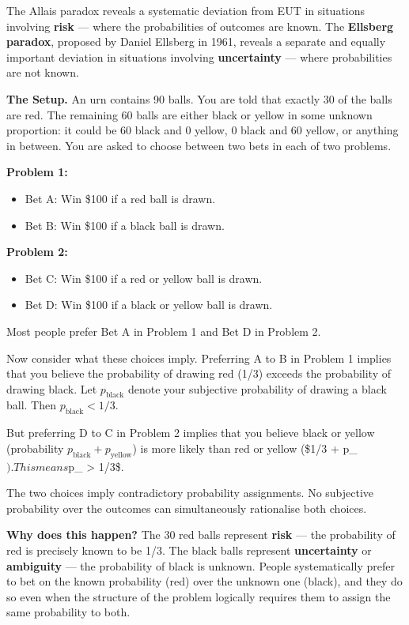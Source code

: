 \documentclass[12pt, letterpaper]{article}
\begin{document}
The Allais paradox reveals a systematic deviation from EUT in situations involving \textbf{risk} --- where the probabilities of outcomes are known. The \textbf{Ellsberg paradox}, proposed by Daniel Ellsberg in 1961, reveals a separate and equally important deviation in situations involving \textbf{uncertainty} --- where probabilities are not known.

\textbf{The Setup.} An urn contains 90 balls. You are told that exactly 30 of the balls are red. The remaining 60 balls are either black or yellow in some unknown proportion: it could be 60 black and 0 yellow, 0 black and 60 yellow, or anything in between. You are asked to choose between two bets in each of two problems.

\textbf{Problem 1:}
\begin{itemize}
\item Bet A: Win \$100 if a red ball is drawn.
\item Bet B: Win \$100 if a black ball is drawn.
\end{itemize}

\textbf{Problem 2:}
\begin{itemize}
\item Bet C: Win \$100 if a red or yellow ball is drawn.
\item Bet D: Win \$100 if a black or yellow ball is drawn.
\end{itemize}

Most people prefer Bet A in Problem 1 and Bet D in Problem 2.

Now consider what these choices imply. Preferring A to B in Problem 1 implies that you believe the probability of drawing red (1/3) exceeds the probability of drawing black. Let $p_\text{black}$ denote your subjective probability of drawing a black ball. Then $p_\text{black} < 1/3$.

But preferring D to C in Problem 2 implies that you believe black or yellow (probability $p_\text{black} + p_\text{yellow}$) is more likely than red or yellow (\$1/3 + p\_$). This means $p\_ > 1/3\$.

The two choices imply contradictory probability assignments. No subjective probability over the outcomes can simultaneously rationalise both choices.

\textbf{Why does this happen?} The 30 red balls represent \textbf{risk} --- the probability of red is precisely known to be 1/3. The black balls represent \textbf{uncertainty} or \textbf{ambiguity} --- the probability of black is unknown. People systematically prefer to bet on the known probability (red) over the unknown one (black), and they do so even when the structure of the problem logically requires them to assign the same probability to both.
\end{document}
